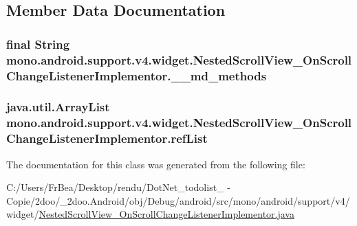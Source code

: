 \subsection{Member Data Documentation}
\hypertarget{classmono_1_1android_1_1support_1_1v4_1_1widget_1_1_nested_scroll_view___on_scroll_change_listener_implementor_ff89a2aa68d424dc98599788cbf43767}{
\subsubsection[{\_\-\_\-md\_\-methods}]{\setlength{\rightskip}{0pt plus 5cm}final String {\bf mono.android.support.v4.widget.NestedScrollView\_\-OnScrollChangeListenerImplementor.\_\-\_\-md\_\-methods}}}
\label{classmono_1_1android_1_1support_1_1v4_1_1widget_1_1_nested_scroll_view___on_scroll_change_listener_implementor_ff89a2aa68d424dc98599788cbf43767}


\hypertarget{classmono_1_1android_1_1support_1_1v4_1_1widget_1_1_nested_scroll_view___on_scroll_change_listener_implementor_ecec2c3cb0d44ea181166dd62953da94}{
\subsubsection[{refList}]{\setlength{\rightskip}{0pt plus 5cm}java.util.ArrayList {\bf mono.android.support.v4.widget.NestedScrollView\_\-OnScrollChangeListenerImplementor.refList}}}
\label{classmono_1_1android_1_1support_1_1v4_1_1widget_1_1_nested_scroll_view___on_scroll_change_listener_implementor_ecec2c3cb0d44ea181166dd62953da94}




The documentation for this class was generated from the following file:\begin{CompactItemize}
\item 
C:/Users/FrBea/Desktop/rendu/DotNet\_\-todolist\_ - Copie/2doo/\_\-2doo.Android/obj/Debug/android/src/mono/android/support/v4/widget/\hyperlink{_nested_scroll_view___on_scroll_change_listener_implementor_8java}{NestedScrollView\_\-OnScrollChangeListenerImplementor.java}\end{CompactItemize}
